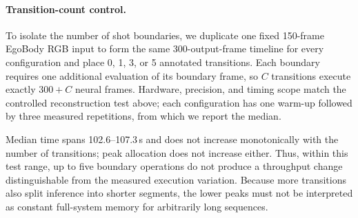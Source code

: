 \paragraph{Transition-count control.}
To isolate the number of shot boundaries, we duplicate one fixed 150-frame
EgoBody RGB input to form the same 300-output-frame timeline for every
configuration and place 0, 1, 3, or 5 annotated transitions. Each boundary
requires one additional evaluation of its boundary frame, so $C$ transitions
execute exactly $300+C$ neural frames. Hardware, precision, and timing scope
match the controlled reconstruction test above; each configuration has one
warm-up followed by three measured repetitions, from which we report the
median.

\begin{table}[t]
  \centering
  \caption{Controlled \method{} runtime and peak allocation versus the
  number of transitions, with 300 output frames. Peak is the maximum PyTorch
  allocated memory over the three measured runs.}
  \label{tab:transition-count-runtime}
  \small
  \resizebox{\linewidth}{!}{}
\end{table}

Median time spans 102.6--107.3\,s and does not increase monotonically with the
number of transitions; peak allocation does not increase either. Thus, within
this test range, up to five boundary operations do not produce a throughput
change distinguishable from the measured execution variation. Because more
transitions also split inference into shorter segments, the lower peaks must
not be interpreted as constant full-system memory for arbitrarily long
sequences.
